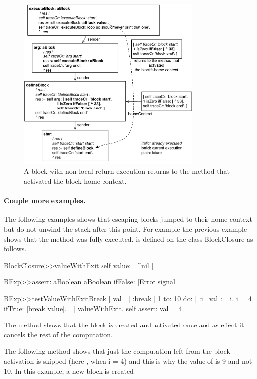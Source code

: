 \documentclass[a4paper,10pt,twoside]{book}
\begin{document}
\begin{figure}[!h]
\begin{center}\includegraphics[width=9cm]{nonLocalReturn}
\caption{A block with non local return execution returns to the method that activated the block home context.\label{nonLocalReturn}}
\end{center}
\end{figure}


\paragraph{Couple more examples.}
The following examples shows that escaping blocks jumped to their home context but do not unwind the stack after this point. For example the previous example shows that the method  was fully executed. 
 is defined on the class BlockClosure as follows.

\begin{code}{}
BlockClosure>>valueWithExit 
	  self value: [ ^nil ]
\end{code}

\begin{code}{}
BExp>>assert: aBoolean
	aBoolean ifFalse: [Error signal]

BExp>>testValueWithExitBreak
	| val |
	[ :break |
	    1 to: 10 do: [ :i |
			val := i.
			i = 4 ifTrue: [break value].
		] 
	] valueWithExit.
	self assert: val = 4.
\end{code}

The method  shows that the block  is created and activated once and as effect it cancels the rest of the computation. 

The following method  shows that just the computation left from the block activation is skipped (here , when i = 4) and this is why the value of  is 9 and not 10. 
In this example, a new block is created 
\end{document}
